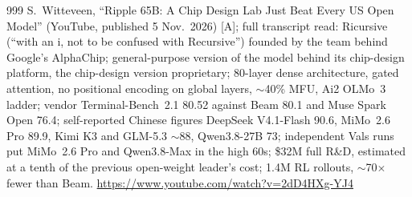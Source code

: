 \begin{thebibliography}{999}
 S.~Witteveen, ``Ripple 65B: A Chip Design Lab Just Beat Every US Open Model'' (YouTube, published 5 Nov.\ 2026) [A]; full transcript read: Ricursive (``with an i, not to be confused with Recursive'') founded by the team behind Google's AlphaChip; general-purpose version of the model behind its chip-design platform, the chip-design version proprietary; 80-layer dense architecture, gated attention, no positional encoding on global layers, $\sim$40\% MFU, Ai2 OLMo~3 ladder; vendor Terminal-Bench~2.1 80.52 against Beam 80.1 and Muse Spark Open 76.4; self-reported Chinese figures DeepSeek V4.1-Flash 90.6, MiMo~2.6 Pro 89.9, Kimi K3 and GLM-5.3 $\sim$88, Qwen3.8-27B 73; independent Vals runs put MiMo~2.6 Pro and Qwen3.8-Max in the high 60s; \$32M full R\&D, estimated at a tenth of the previous open-weight leader's cost; 1.4M RL rollouts, $\sim$70$\times$ fewer than Beam. \url{https://www.youtube.com/watch?v=2dD4HXg-YJ4}

\end{thebibliography}